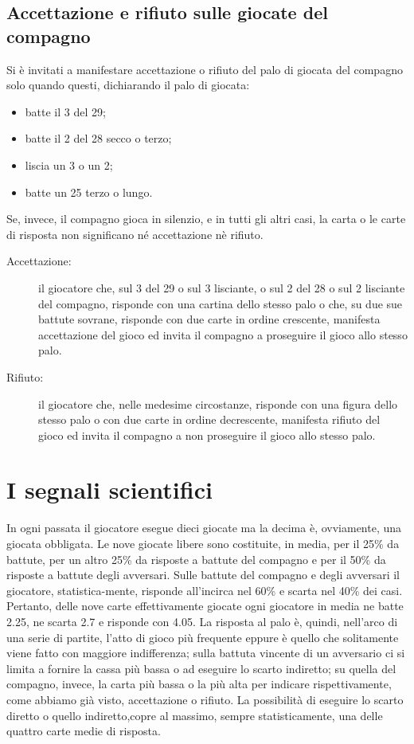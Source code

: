 \documentclass[italian,a4paper]{article}
\newenvironment{packeditem}{
\begin{itemize}
  \setlength{\itemsep}{1pt}
  \setlength{\parskip}{0pt}
  \setlength{\parsep}{0pt}
}{\end{itemize}}
\begin{document}
\subsection{Accettazione e rifiuto sulle giocate del compagno}
Si è invitati a manifestare accettazione o rifiuto del palo di giocata del compagno solo quando questi, dichiarando il palo di giocata:
\begin{packeditem}
\item       batte il 3 del 29;
\item       batte il 2 del 28 secco o terzo;
\item       liscia un 3 o un 2;
\item       batte un 25 terzo o lungo.
\end{packeditem}
Se, invece, il compagno gioca in silenzio, e in tutti gli altri casi, la carta o le carte di risposta non significano né accettazione nè rifiuto.
\begin{description}
    \item[Accettazione:]
il giocatore che, sul 3 del 29 o sul 3 lisciante, o sul 2 del 28 o sul 2 lisciante del compagno, risponde con una cartina dello stesso palo o che, su due sue battute sovrane,  risponde con due carte in ordine crescente, manifesta accettazione del gioco ed invita il compagno a proseguire il gioco allo stesso palo.
    \item[Rifiuto:] 
il giocatore che, nelle medesime circostanze, risponde con una figura dello stesso palo o con due carte in ordine decrescente, manifesta rifiuto del gioco ed invita il compagno a non proseguire il gioco allo stesso palo.
\end{description}
\section{I segnali scientifici}
In ogni passata il giocatore esegue dieci giocate ma la decima è, ovviamente, una giocata obbligata.
Le nove giocate libere sono costituite, in media, per il 25\% da battute, per un altro 25\% da risposte a battute del compagno e per il 50\% da risposte a battute degli avversari.
Sulle battute del compagno e degli avversari il giocatore, statistica-mente, risponde all'incirca nel 60\% e scarta nel 40\% dei casi.
Pertanto, delle nove carte effettivamente giocate ogni giocatore in media ne batte 2.25, ne scarta 2.7 e risponde con 4.05.
La risposta al palo è, quindi, nell'arco di una serie di partite, l'atto di gioco più frequente eppure è quello che solitamente viene fatto con maggiore indifferenza; sulla battuta vincente di un avversario ci si limita a fornire la cassa più bassa o ad eseguire lo scarto indiretto; su quella del compagno, invece, la carta più bassa o la più alta per indicare rispettivamente, come abbiamo già visto, accettazione o rifiuto. La possibilità di eseguire lo scarto diretto o quello indiretto,copre al massimo, sempre statisticamente, una delle quattro carte medie di risposta.
\end{document}
